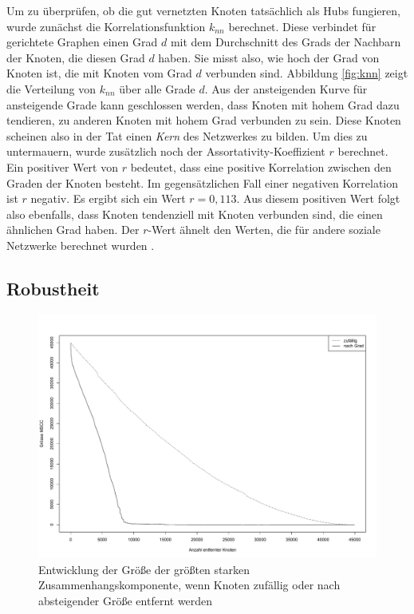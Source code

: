 Um zu überprüfen, ob die gut vernetzten Knoten tatsächlich als
Hubs fungieren, wurde zunächst die Korrelationsfunktion $k_{nn}$
berechnet. Diese verbindet für gerichtete Graphen einen Grad $d$ mit
dem Durchschnitt des Grads der Nachbarn der Knoten, die diesen Grad
$d$ haben. Sie misst also, wie hoch der Grad von Knoten ist, die mit
Knoten vom Grad $d$ verbunden sind. Abbildung \ref{fig:knn} zeigt die
Verteilung von $k_{nn}$ über alle Grade $d$. Aus der ansteigenden
Kurve für ansteigende Grade kann geschlossen werden, dass Knoten mit
hohem Grad dazu tendieren, zu anderen Knoten mit hohem Grad verbunden
zu sein. Diese Knoten scheinen also in der Tat einen \emph{Kern} des
Netzwerkes zu bilden. Um dies zu untermauern, wurde zusätzlich noch
der Assortativity-Koeffizient $r$ \cite{PhysRevLett.89.208701}
berechnet. Ein positiver Wert von $r$ bedeutet, dass eine positive
Korrelation zwischen den Graden der Knoten besteht. Im
gegensätzlichen Fall einer negativen Korrelation ist $r$ negativ. Es
ergibt sich ein Wert $r = 0,113$. Aus diesem positiven Wert folgt also
ebenfalls, dass Knoten tendenziell mit Knoten verbunden sind, die
einen ähnlichen Grad haben. Der $r$-Wert ähnelt den Werten, die
für andere soziale Netzwerke berechnet wurden \cite{newman:167}.

\subsection{Robustheit}
\label{sec:robustheit}

\begin{figure}[ht!]
  \centering
  \includegraphics[scale=0.45]{images/without.pdf}
  \caption{Entwicklung der Größe der größten starken
    Zusammenhangskomponente, wenn Knoten zufällig oder nach absteigender
    Größe entfernt werden}
  \label{fig:without}
\end{figure}

